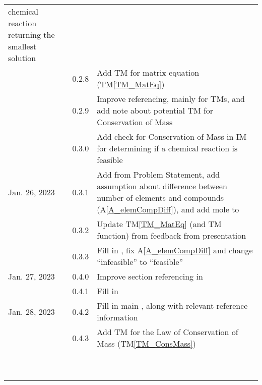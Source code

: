 \documentclass[12pt]{article}
\newcommand{\tmref}[1]{TM\ref{#1}}
\newcommand{\aref}[1]{A\ref{#1}}
\begin{document}
\begin{tabularx}{\textwidth}{p{2.5cm}p{1.5cm}X}
  chemical reaction returning the smallest solution                                                          \\
                      & 0.2.8         & Add TM for matrix equation (\tmref{TM_MatEq})                        \\
                      & 0.2.9         & Improve referencing, mainly for TMs, and add note about
  potential TM for Conservation of Mass                                                                      \\
                      & 0.3.0         & Add check for Conservation of Mass
  in IM for determining if a chemical reaction is feasible                                                   \\
  Jan. 26, 2023       & 0.3.1         & Add \nameref{sec_LCs} from Problem Statement, add
  assumption about difference between number of elements and compounds
  (\aref{A_elemCompDiff}), and add mole to \nameref{sec_ToU}                                                 \\
                      & 0.3.2         & Update \tmref{TM_MatEq} (and TM function) from feedback from
  presentation                                                                                               \\
                      & 0.3.3         & Fill in \nameref{sec_scope}, fix \aref{A_elemCompDiff} and
  change ``infeasible'' to ``feasible''                                                                      \\
  Jan. 27, 2023       & 0.4.0         & Improve section referencing in \nameref{sec_revHist}                 \\
                      & 0.4.1         & Fill in \nameref{sec_funcReqs}                                       \\
  Jan. 28, 2023       & 0.4.2         & Fill in main \nameref{sec_nonfuncReqs}, along with
  relevant reference information                                                                             \\
                      & 0.4.3         & Add TM for the Law of Conservation of Mass
  (\tmref{TM_ConsMass})                                                                                      \\
  \bottomrule~                                                                                               \\
  ~                                                                                                          \\

\end{tabularx}
\end{document}
